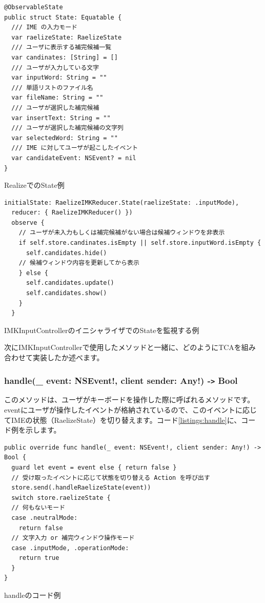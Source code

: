 \documentclass[uplatex,a4j,12pt,twocolumn]{jsarticle}
\begin{document}
\begin{listing}[h]
  \begin{verbatim}
@ObservableState
public struct State: Equatable {
  /// IME の入力モード
  var raelizeState: RaelizeState
  /// ユーザに表示する補完候補一覧
  var candinates: [String] = []
  /// ユーザが入力している文字
  var inputWord: String = ""
  /// 単語リストのファイル名
  var fileName: String = ""
  /// ユーザが選択した補完候補
  var insertText: String = ""
  /// ユーザが選択した補完候補の文字列
  var selectedWord: String = ""
  /// IME に対してユーザが起こしたイベント
  var candidateEvent: NSEvent? = nil
}
  \end{verbatim}
  \caption{RealizeでのState例}\label{listings:state}
\end{listing}

\begin{listing}[H]
  \begin{verbatim}
initialState: RaelizeIMKReducer.State(raelizeState: .inputMode),
  reducer: { RaelizeIMKReducer() })
  observe {
    // ユーザが未入力もしくは補完候補がない場合は候補ウィンドウを非表示
    if self.store.candinates.isEmpty || self.store.inputWord.isEmpty {
      self.candidates.hide()
    // 候補ウィンドウ内容を更新してから表示
    } else {
      self.candidates.update()
      self.candidates.show()
    }
  }
  \end{verbatim}
  \caption{IMKInputControllerのイニシャライザでのStateを監視する例}\label{listings:initial_state}
\end{listing}
次にIMKInputControllerで使用したメソッドと一緒に、どのようにTCAを組み合わせて実装したか述べます。
\subsubsection{handle(\_ event: NSEvent!, client sender: Any!) -\texttt{>} Bool}
このメソッドは、ユーザがキーボードを操作した際に呼ばれるメソッドです。eventにユーザが操作したイベントが格納されているので、このイベントに応じてIMEの状態（RaelizeState）を切り替えます。コード\ref{listings:handle}に、コード例を示します。
\begin{listing}[h]
  \begin{verbatim}
public override func handle(_ event: NSEvent!, client sender: Any!) -> Bool {
  guard let event = event else { return false }
  // 受け取ったイベントに応じて状態を切り替える Action を呼び出す
  store.send(.handleRaelizeState(event))
  switch store.raelizeState {
  // 何もないモード
  case .neutralMode:
    return false
  // 文字入力 or 補完ウィンドウ操作モード  
  case .inputMode, .operationMode:
    return true
  }
}
  \end{verbatim}
  \caption{handleのコード例}\label{listings:handle}
\end{listing}
\end{document}
